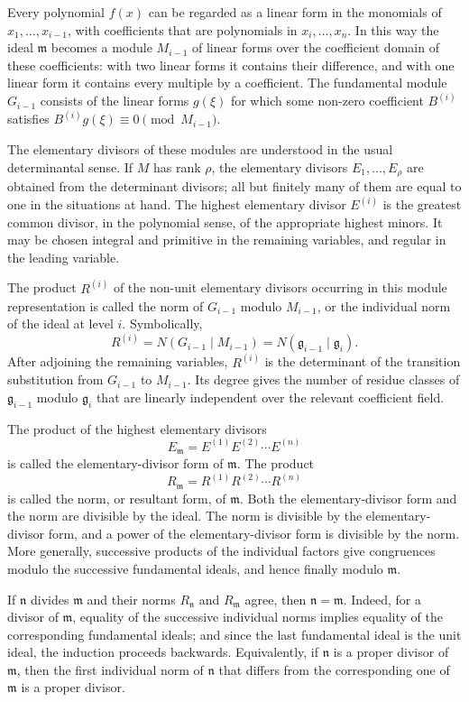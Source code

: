 \documentclass[11pt]{article}
\begin{document}
Every polynomial $f(x)$ can be regarded as a linear form in the monomials of $x_1,\ldots,x_{i-1}$, with coefficients that are polynomials in $x_i,\ldots,x_n$. In this way the ideal $\mathfrak m$ becomes a module $M_{i-1}$ of linear forms over the coefficient domain of these coefficients: with two linear forms it contains their difference, and with one linear form it contains every multiple by a coefficient. The fundamental module $G_{i-1}$ consists of the linear forms $g(\xi)$ for which some non-zero coefficient $B^{(i)}$ satisfies $B^{(i)}g(\xi)\equiv0\pmod{M_{i-1}}$.

The elementary divisors of these modules are understood in the usual determinantal sense. If $M$ has rank $\rho$, the elementary divisors $E_1,\ldots,E_\rho$ are obtained from the determinant divisors; all but finitely many of them are equal to one in the situations at hand. The highest elementary divisor $E^{(i)}$ is the greatest common divisor, in the polynomial sense, of the appropriate highest minors. It may be chosen integral and primitive in the remaining variables, and regular in the leading variable.

The product $R^{(i)}$ of the non-unit elementary divisors occurring in this module representation is called the norm of $G_{i-1}$ modulo $M_{i-1}$, or the individual norm of the ideal at level $i$. Symbolically,
\[
  R^{(i)}=N(G_{i-1}\mid M_{i-1})=N(\mathfrak g_{i-1}\mid \mathfrak g_i).
\]
After adjoining the remaining variables, $R^{(i)}$ is the determinant of the transition substitution from $G_{i-1}$ to $M_{i-1}$. Its degree gives the number of residue classes of $\mathfrak g_{i-1}$ modulo $\mathfrak g_i$ that are linearly independent over the relevant coefficient field.

The product of the highest elementary divisors
\[
  E_{\mathfrak m}=E^{(1)}E^{(2)}\cdots E^{(n)}
\]
is called the elementary-divisor form of $\mathfrak m$. The product
\[
  R_{\mathfrak m}=R^{(1)}R^{(2)}\cdots R^{(n)}
\]
is called the norm, or resultant form, of $\mathfrak m$. Both the elementary-divisor form and the norm are divisible by the ideal. The norm is divisible by the elementary-divisor form, and a power of the elementary-divisor form is divisible by the norm. More generally, successive products of the individual factors give congruences modulo the successive fundamental ideals, and hence finally modulo $\mathfrak m$.

If $\mathfrak n$ divides $\mathfrak m$ and their norms $R_{\mathfrak n}$ and $R_{\mathfrak m}$ agree, then $\mathfrak n=\mathfrak m$. Indeed, for a divisor of $\mathfrak m$, equality of the successive individual norms implies equality of the corresponding fundamental ideals; and since the last fundamental ideal is the unit ideal, the induction proceeds backwards. Equivalently, if $\mathfrak n$ is a proper divisor of $\mathfrak m$, then the first individual norm of $\mathfrak n$ that differs from the corresponding one of $\mathfrak m$ is a proper divisor.
\end{document}
